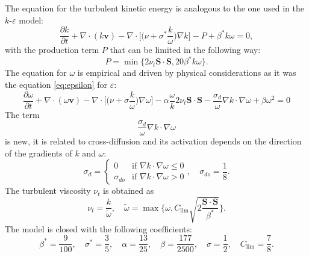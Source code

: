 The equation for the turbulent kinetic energy is analogous to the one used in 
the $k\text{-}\varepsilon$ model:
\begin{equation} \label{eq:komegak}
	\frac{\partial k}{\partial t} + \nabla \cdot (k\mathbf{v}) - \nabla \cdot 
\bigg[\bigg(\nu + \sigma^*\frac{k}{\omega}\bigg) \nabla k\bigg] -P + \beta^* k 
\omega = 0,
\end{equation}
with the production term $P$ that can be limited in the following way:
\begin{equation}
	P = \min \{ 2 \nu_t \mathbf{S} \cdot \mathbf{S}, 20 \beta^* k \omega \}.
\end{equation}
The equation for $\omega$ is empirical and driven by physical considerations as 
it was the equation \eqref{eq:epsilon} for $\varepsilon$:
\begin{equation} \label{eq:komegaomega}
	\frac{\partial \omega}{\partial t} + \nabla \cdot (\omega \mathbf{v}) - 
	\nabla \cdot \bigg[ \bigg( \nu + \sigma \frac{k}{\omega} \bigg) \nabla 
	\omega 
	\bigg] - \alpha \frac{\omega}{k} 2 \nu_t \mathbf{S} \cdot \mathbf{S} 
	-\frac{\sigma_d}{\omega} \nabla k \cdot 
	\nabla \omega+ \beta \omega^2 = 0
\end{equation}
The term
\begin{equation}
\frac{\sigma_d}{\omega} \nabla k \cdot \nabla \omega
\end{equation}
is new, it is related to cross-diffusion and its activation depends on the 
direction of the gradients of $k$ and $\omega$:
\begin{equation}
\sigma_d =
\begin{cases}
0 &\text{if $\nabla k \cdot \nabla \omega \leq 0$}\\
\sigma_{do} &\text{if $\nabla k \cdot \nabla \omega > 0$}
\end{cases},
\quad \sigma_{do} = \frac{1}{8}.
\end{equation}
The turbulent viscosity $\nu_t$ is obtained as
\begin{equation}
\nu_t = \frac{k}{\tilde{\omega}}, \quad \tilde{\omega} = \max \Bigg\{ \omega, 
C_\text{lim} \sqrt{ 2\frac{\mathbf{S}\cdot\mathbf{S}}{\beta^*}} \Bigg\}.
\end{equation}
The model is closed with the following coefficients:
\begin{equation}
	\beta^* = \frac{9}{100}, \quad \sigma^* = \frac{3}{5}, \quad \alpha = 
	\frac{13}{25}, \quad \beta = \frac{177}{2500}, \quad \sigma = \frac{1}{2}, 
	\quad C_\text{lim} = \frac{7}{8}.
\end{equation}

